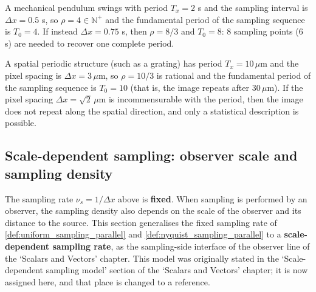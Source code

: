 \begin{example}\label{ex:discrete_clock_modelling}
A mechanical pendulum swings with period $T_x=2$ s and the sampling interval is $\Delta x=0.5$ s, so $\rho=4\in\mathbb{N}^+$ and the fundamental period of the sampling sequence is $T_0=4$. If instead $\Delta x=0.75$ s, then $\rho=8/3$ and $T_0=8$: $8$ sampling points ($6$ s) are needed to recover one complete period.
\end{example}

\begin{example}\label{ex:sensor_modelling}
A spatial periodic structure (such as a grating) has period $T_x=10\,\mu$m and the pixel spacing is $\Delta x=3\,\mu$m, so $\rho=10/3$ is rational and the fundamental period of the sampling sequence is $T_0=10$ (that is, the image repeats after $30\,\mu$m). If the pixel spacing $\Delta x=\sqrt{2}\,\mu$m is incommensurable with the period, then the image does not repeat along the spatial direction, and only a statistical description is possible.
\end{example}

\subsection{Scale-dependent sampling: observer scale and sampling density}\label{sec:dynamic_sampling}

The sampling rate $\nu_s=1/\Delta x$ above is \textbf{fixed}. When sampling is performed by an observer, the sampling density also depends on the scale of the observer and its distance to the source. This section generalises the fixed sampling rate of \cref{def:uniform_sampling_parallel} and \cref{def:nyquist_sampling_parallel} to a \textbf{scale-dependent sampling rate}, as the sampling-side interface of the observer line of the `Scalars and Vectors' chapter. This model was originally stated in the `Scale-dependent sampling model' section of the `Scalars and Vectors' chapter; it is now assigned here, and that place is changed to a reference.

